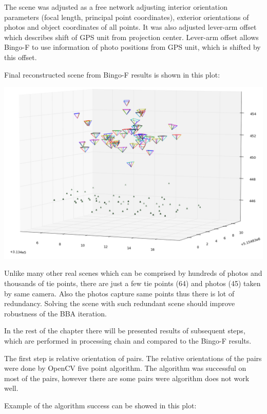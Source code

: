 \documentclass[a4paper,12pt]{article}
\begin{document}
The scene was adjusted as a free network adjusting interior orientation parameters (focal length, principal point coordinates),
exterior orientations of photos and object coordinates of all points. It was also adjusted lever-arm offset which describes 
shift of GPS unit from projection center.  Lever-arm offset allows Bingo-F to use information of photo positions from GPS unit,
which is shifted by this offset.  

Final reconstructed  scene from Bingo-F results is shown in this plot:


\includegraphics[scale=0.4]{figures/bingo_result.png}

Unlike many other real scenes which can be comprised by hundreds of photos and thousands of tie points,   
there are just a few tie points (64) and photos (45) taken by same camera. Also the photos capture same points thus there 
is lot of redundancy. Solving the scene with such redundant scene should improve robustness of the BBA iteration. 

In the rest of the chapter there will be presented results of subsequent steps, which are performed in processing chain and compared 
to the Bingo-F results.

The first step is relative orientation of pairs. The relative orientations of the pairs were done by OpenCV five point algorithm.
The algorithm was successful on most of the pairs, however there are some pairs were algorithm does not work well.

Example of the algorithm success can be showed in this plot:

\end{document}
